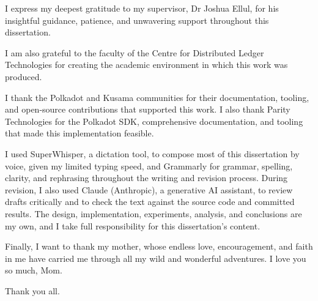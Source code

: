 
\begin{acknowledgements}

I express my deepest gratitude to my supervisor, Dr Joshua Ellul, for his insightful guidance, patience, and unwavering support throughout this dissertation.

I am also grateful to the faculty of the Centre for Distributed Ledger Technologies for creating the academic environment in which this work was produced.

I thank the Polkadot and Kusama communities for their documentation, tooling, and open-source contributions that supported this work. I also thank Parity Technologies for the Polkadot SDK, comprehensive documentation, and tooling that made this implementation feasible.

I used SuperWhisper, a dictation tool, to compose most of this dissertation by voice, given my limited typing speed, and Grammarly for grammar, spelling, clarity, and rephrasing throughout the writing and revision process. During revision, I also used Claude (Anthropic), a generative AI assistant, to review drafts critically and to check the text against the source code and committed results. The design, implementation, experiments, analysis, and conclusions are my own, and I take full responsibility for this dissertation's content.

Finally, I want to thank my mother, whose endless love, encouragement, and faith in me have carried me through all my wild and wonderful adventures. I love you so much, Mom.

Thank you all.

\end{acknowledgements}
